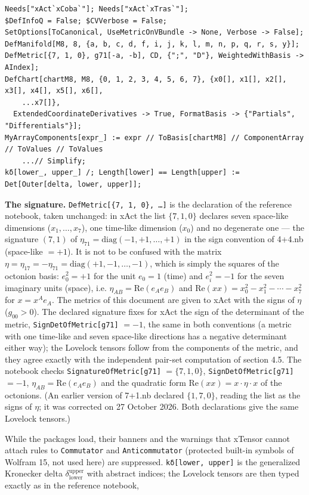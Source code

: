 \documentclass[10pt,a4paper]{article}
\begin{document}
\begin{Verbatim}[fontsize=\small,frame=single,framesep=2mm]
Needs["xAct`xCoba`"]; Needs["xAct`xTras`"];
$DefInfoQ = False; $CVVerbose = False;
SetOptions[ToCanonical, UseMetricOnVBundle -> None, Verbose -> False];
DefManifold[M8, 8, {a, b, c, d, f, i, j, k, l, m, n, p, q, r, s, y}];
DefMetric[{7, 1, 0}, g71[-a, -b], CD, {";", "D"}, WeightedWithBasis -> AIndex];
DefChart[chartM8, M8, {0, 1, 2, 3, 4, 5, 6, 7}, {x0[], x1[], x2[], x3[], x4[], x5[], x6[],
    ...x7[]},
  ExtendedCoordinateDerivatives -> True, FormatBasis -> {"Partials", "Differentials"}];
MyArrayComponents[expr_] := expr // ToBasis[chartM8] // ComponentArray // ToValues // ToValues
    ...// Simplify;
kδ[lower_, upper_] /; Length[lower] == Length[upper] := Det[Outer[delta, lower, upper]];
\end{Verbatim}
\textbf{The signature.} \texttt{DefMetric[\{7, 1, 0\}, …]} is the declaration of the reference notebook, taken unchanged: in xAct the list $\{7,1,0\}$ declares seven space-like dimensions ($x_1,\dots,x_7$), one time-like dimension ($x_0$) and no degenerate one — the signature $(7,1)$ of $\eta_{71}=\mathrm{diag}(-1,+1,\dots,+1)$ in the sign convention of 4+4.nb (space-like $=+1$). It is not to be confused with the matrix $\eta=\eta_{17}=-\eta_{71}=\mathrm{diag}(+1,-1,\dots,-1)$, which is simply the squares of the octonion basis: $e_0^2=+1$ for the unit $e_0=1$ (time) and $e_i^2=-1$ for the seven imaginary units (space), i.e. $\eta_{AB}=\mathrm{Re}(e_Ae_B)$ and $\mathrm{Re}(xx)=x_0^2-x_1^2-\cdots-x_7^2$ for $x=x^Ae_A$. The metrics of this document are given to xAct with the signs of $\eta$ ($g_{00}>0$). The declared signature fixes for xAct the sign of the determinant of the metric, \texttt{SignDetOfMetric[g71]} $=-1$, the same in both conventions (a metric with one time-like and seven space-like directions has a negative determinant either way); the Lovelock tensors follow from the components of the metric, and they agree exactly with the independent pair-set computation of section 4.5. The notebook checks \texttt{SignatureOfMetric[g71]} $=\{7,1,0\}$, \texttt{SignDetOfMetric[g71]} $=-1$, $\eta_{AB}=\mathrm{Re}(e_Ae_B)$ and the quadratic form $\mathrm{Re}(xx)=x\cdot\eta\cdot x$ of the octonions. (An earlier version of 7+1.nb declared $\{1,7,0\}$, reading the list as the signs of $\eta$; it was corrected on 27 October 2026. Both declarations give the same Lovelock tensors.)

While the packages load, their banners and the warnings that xTensor cannot attach rules to \texttt{Commutator} and \texttt{Anticommutator} (protected built-in symbols of Wolfram 15, not used here) are suppressed. \texttt{kδ[lower, upper]} is the generalized Kronecker delta $\delta^{\text{upper}}_{\text{lower}}$ with abstract indices; the Lovelock tensors are then typed exactly as in the reference notebook,
\end{document}
